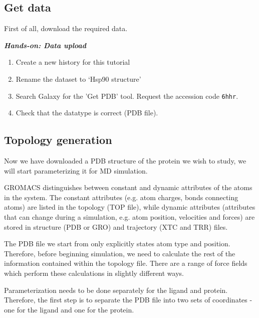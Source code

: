 \documentclass[twocolumn]{bmcart}%
\providecommand{\tightlist}{%
  \setlength{\itemsep}{0pt}\setlength{\parskip}{0pt}}
\providecommand{\tightlist}{%
  \setlength{\itemsep}{0pt}\setlength{\parskip}{0pt}}
\begin{document}
\subsection{Get data}\label{get-data}

First of all, download the required data.

\begin{abstract_box}
\textbf{\emph{Hands-on: Data upload}}

\begin{enumerate}
\def\labelenumi{\arabic{enumi}.}
\tightlist
\item
  Create a new history for this tutorial

\item
  Rename the dataset to `Hsp90 structure'
\item
  Search Galaxy for the 'Get PDB' tool. Request the accession code \texttt{6hhr}.
\item
  Check that the datatype is correct (PDB file).
\end{enumerate}
\end{abstract_box}
\subsection{Topology generation}\label{topology-generation}

Now we have downloaded a PDB structure of the protein we wish to study, we will start parameterizing it for MD simulation.

GROMACS distinguishes between constant and dynamic attributes of the
atoms in the system. The constant attributes (e.g. atom charges, bonds
connecting atoms) are listed in the topology (TOP file), while dynamic
attributes (attributes that can change during a simulation, e.g. atom
position, velocities and forces) are stored in structure (PDB or GRO)
and trajectory (XTC and TRR) files.

The PDB file we start from only explicitly states atom type and
position. Therefore, before beginning simulation, we need to calculate
the rest of the information contained within the topology file. There
are a range of force fields which perform these calculations in slightly
different ways.


Parameterization needs to be done separately for the ligand and protein.
Therefore, the first step is to separate the PDB file into two sets of
coordinates - one for the ligand and one for the protein.
\end{document}
